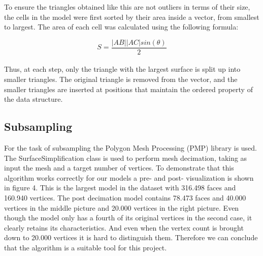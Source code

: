 \documentclass{bigdata}
\begin{document}
\noindent To ensure the triangles obtained like this are not outliers in terms of their size, the cells in the model were first sorted by their area inside a vector, from smallest to largest. The area of each cell was calculated using the following formula:

\begin{equation}
S = \frac{|AB||AC|sin(\theta)}{2}
\end{equation}\\

\noindent Thus, at each step, only the triangle with the largest surface is split up into smaller triangles. The original triangle is removed from the vector, and the smaller triangles are inserted at positions that maintain the ordered property of the data structure.

\subsection{Subsampling}
For the task of subsampling the Polygon Mesh Processing (PMP) library is used. The SurfaceSimplification class is used to perform mesh decimation, taking as input the mesh and a target number of vertices. To demonstrate that this algorithm works correctly for our models a pre- and post- visualization is shown in figure 4. This is the largest model in the dataset with 316.498 faces and 160.940 vertices. The post decimation model contains 78.473 faces and 40.000 vertices in the middle picture and 20.000 vertices in the right picture. Even though the model only has a fourth of its original vertices in the second case, it clearly retains its characteristics. And even when the vertex count is brought down to 20.000 vertices it is hard to distinguish them. Therefore we can conclude that the algorithm is a suitable tool for this project.
\end{document}
